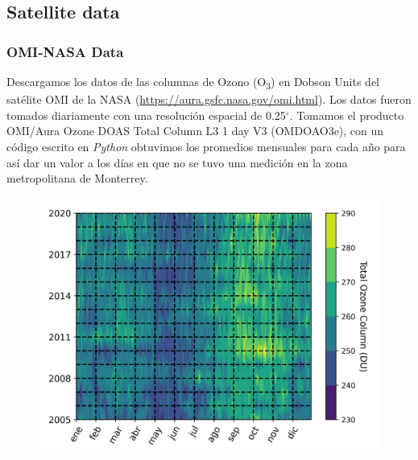 \subsection{Satellite data}
\subsubsection{OMI-NASA Data}
Descargamos los datos de las columnas de Ozono (O\textsubscript{3}) en Dobson Units del satélite OMI de la NASA 
(\url{https://aura.gsfc.nasa.gov/omi.html}). Los datos fueron tomados diariamente con una resolución espacial de 0.25$^{\circ}$.
Tomamos el producto OMI/Aura Ozone DOAS Total Column L3 1 day V3 (OMDOAO3e), con un código escrito en \textit{Python} obtuvimos
los promedios mensuales para cada año para así dar un valor a los días en que no se tuvo una medición en la zona metropolitana de Monterrey.
\begin{figure}[H]
    \centering
    \includegraphics[scale=0.5]{images/Ozono_Daily.png}
    \caption{}
    \label{fig:ozono_daily}
\end{figure}
